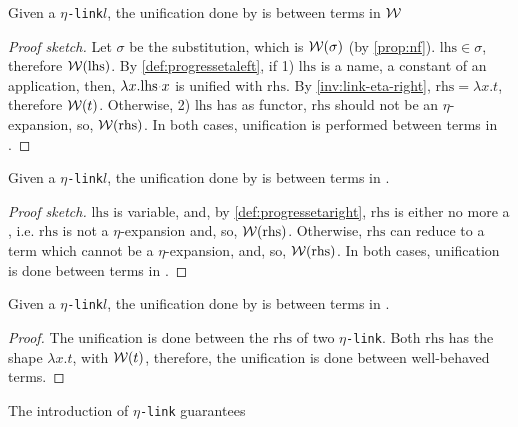 \documentclass[sigconf,natbib=false,review]{acmart}
\newcommand{\appsep}{\ensuremath{\textcolor{lightgray}{\cdot}}}
\newcommand{\linkMacro}[1]{\ensuremath{#1}\texttt{-link}\xspace}
\newcommand{\linketa} {\linkMacro{\eta}}
\newcommand{\lhs}{\ensuremath{\mathrm{lhs}}\xspace}
\newcommand{\rhs}{\ensuremath{\mathrm{rhs}}\xspace}
\begin{document}
\begin{lemma}
  Given a \linketa $l$, the unification done by \progressetaleft is between
  terms in $\mathcal{W}$  
  \label{lemma:unif-eta-1}
\end{lemma}

\begin{proof}[Proof sketch]
  Let $\sigma$ be the substitution, which is  $\mathcal{W}(\sigma)$ (by
  \cref{prop:nf}). $\lhs \in \sigma$, therefore $\wellb(\lhs)$. By
  \cref{def:progressetaleft}, if 1) \lhs is a name, a constant of an
  application, then, $\lambda x.\lhs \appsep x$ is unified with \rhs. By
  \cref{inv:link-eta-right}, $\rhs = \lambda x. t$, therefore $\mathcal{W}(t)$.
  Otherwise, 2) \lhs has  as functor, \rhs should not be an
  $\eta$-expansion, so, $\wellb(\rhs)$. In both cases, unification is
  performed between terms in \wellb.
\end{proof}

\begin{lemma}
  Given a \linketa $l$, the unification done by \progressetaright is between
  terms in \wellb.
  \label{lemma:unif-eta-2}
\end{lemma}

\begin{proof}[Proof sketch]
  \lhs is variable, and, by \cref{def:progressetaright}, \rhs is either no more
  a \maybeeta, i.e. \rhs is not a $\eta$-expansion and, so, $\wellb(\rhs)$.
  Otherwise, \rhs can reduce to a term which cannot be a $\eta$-expansion, and,
  so, $\wellb(\rhs)$. In both cases, unification is done between terms in
  \wellb.
\end{proof}

\begin{lemma}
  Given a \linketa $l$, the unification done by \progressetadedup is between
  terms in \wellb.
  \label{lemma:unif-eta-3}
\end{lemma}

\begin{proof}
  The unification is done between the \rhs of two
  \linketa. Both \rhs has the shape $\lambda x.t$, with $\mathcal{W}(t)$, therefore,
  the unification is done between well-behaved terms.
\end{proof}

\begin{lemma}
  The introduction of \linketa guarantees 
  \label{lemma:unif-wellb}
\end{lemma}
\end{document}

